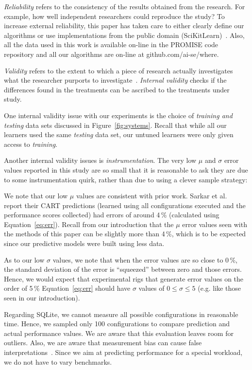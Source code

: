 \documentclass{sig-alternative}
\newcommand{\fig}[1]{Figure~\ref{fig:#1}}
\newcommand{\eq}[1]{Equation~\ref{eq:#1}}
\begin{document}
{\em Reliability} refers to the consistency of the results obtained
from the research.  For example,   how well independent researchers
could reproduce the study? To increase external
reliability, this paper has taken care to either  clearly define our
algorithms or use implementations from the public domain
(SciKitLearn)~\cite{scikit-learn}. Also, all the data used in this work is available
on-line in the PROMISE code repository and all our algorithms
are on-line at github.com/ai-se/where.

{\em Validity} refers to the extent to which a piece of research actually
investigates what the researcher purports to investigate~\cite{SSA15}.
{\em Internal validity} checks if the differences found in
the treatments can be ascribed to the treatments under study. 

One internal validity issue with our experiments is the choice
of {\em training and testing} data sets discussed in 
\fig{systems}. Recall that while all our learners used the same
{\em testing} data set, our untuned learners were only given
access to {\em training}.

Another internal validity issues is {\em instrumentation}. The very low $\mu$ and $\sigma$ error values
reported in this study are so small that it is reasonable to ask they are due to some instrumentation
quirk, rather than due to using a clever sample strategy:
\begin{compactitem}
\item
We note that our low $\mu$ values are consistent with prior work.  Sarkar et al.~\cite{sarkar2015cost} report their CART predictions
(learned using all configurations executed and the performance scores collected) had  errors of around 4\,\% (calculated using \eq{err}). Recall from our introduction that the  $\mu$ error values  seen with the methods of this paper
can be slightly more than 4\,\%, which is to be expected since our predictive models were built using less
data. 
\item
As to our low $\sigma$ values, we note that when the  error values are so close to 0\,\%, the standard
deviation of the error is ``squeezed'' between zero and those errors. Hence, we would expect that
experimental rigs
that generate error values on the order of 5\,\% \eq{err} should have $\sigma$ values of $0\le \sigma \le 5$ (e.g. like those seen in our introduction).
\end{compactitem}

Regarding SQLite, we cannot measure all possible configurations in reasonable time. Hence, we sampled only 100 configurations to compare prediction and actual performance values. We are aware that this evaluation leaves room for outliers.
Also, we are aware that measurement bias can cause false interpretations~\cite{}. Since we aim at predicting performance for a special workload, we do not have to vary benchmarks.
\end{document}
